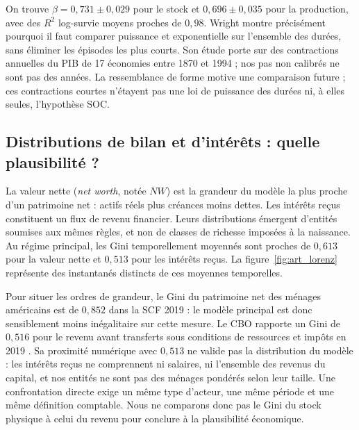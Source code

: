 On trouve $\beta=0{,}731\pm0{,}029$ pour le stock et
$0{,}696\pm0{,}035$ pour la production, avec des $R^2$ log-survie moyens
proches de $0{,}98$. Wright \cite{wright} montre précisément pourquoi il
faut comparer puissance et exponentielle sur l'ensemble des durées, sans
éliminer les épisodes les plus courts. Son étude porte sur des contractions
annuelles du PIB de 17 économies entre 1870 et 1994 ; nos pas non calibrés
ne sont pas des années. La ressemblance de forme motive une comparaison
future ; ces contractions courtes n'étayent pas une loi de puissance des
durées ni, à elles seules, l'hypothèse SOC.

\subsection{Distributions de bilan et d'intérêts : quelle plausibilité ?}
La valeur nette (\emph{net worth}, notée $NW$) est la grandeur du modèle
la plus proche d'un patrimoine net : actifs réels plus créances moins
dettes. Les intérêts reçus constituent
un flux de revenu financier. Leurs distributions émergent d'entités soumises
aux mêmes règles, et non de classes de richesse imposées à la naissance.
Au régime principal, les Gini temporellement moyennés sont proches de
$0{,}613$ pour la valeur nette et $0{,}513$ pour les intérêts reçus.
La figure~\ref{fig:art_lorenz} représente des instantanés distincts de ces
moyennes temporelles.


Pour situer les ordres de grandeur, le Gini du patrimoine net des ménages
américains est de $0{,}852$ dans la SCF 2019 \cite{fedgini} : le modèle
principal est donc sensiblement moins inégalitaire sur cette mesure.
Le CBO rapporte un Gini de $0{,}516$ pour le revenu avant transferts sous
conditions de ressources et impôts en 2019 \cite{cbogini}. Sa proximité
numérique avec $0{,}513$ ne valide pas la distribution du modèle : les
intérêts reçus ne comprennent ni salaires, ni l'ensemble des revenus du
capital, et nos entités ne sont pas des ménages pondérés selon leur taille.
Une confrontation directe exige un même type d'acteur, une même période
et une même définition comptable. Nous ne comparons donc pas le Gini du
stock physique à celui du revenu pour conclure à la plausibilité économique.

